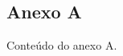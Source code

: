 \begin{anexosenv}

	\partanexos

	\chapter{Anexo A}
	\label{anx:anexoA}

	Conteúdo do anexo A.

\end{anexosenv}
